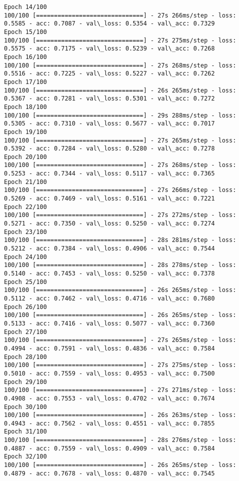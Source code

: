 \documentclass[11pt]{article}
\begin{document}
\begin{Verbatim}[commandchars=\\\{\}]
Epoch 14/100
100/100 [==============================] - 27s 266ms/step - loss: 0.5585 - acc: 0.7087 - val\_loss: 0.5354 - val\_acc: 0.7329
Epoch 15/100
100/100 [==============================] - 27s 275ms/step - loss: 0.5575 - acc: 0.7175 - val\_loss: 0.5239 - val\_acc: 0.7268
Epoch 16/100
100/100 [==============================] - 27s 268ms/step - loss: 0.5516 - acc: 0.7225 - val\_loss: 0.5227 - val\_acc: 0.7262
Epoch 17/100
100/100 [==============================] - 26s 265ms/step - loss: 0.5367 - acc: 0.7281 - val\_loss: 0.5301 - val\_acc: 0.7272
Epoch 18/100
100/100 [==============================] - 29s 288ms/step - loss: 0.5305 - acc: 0.7310 - val\_loss: 0.5677 - val\_acc: 0.7017
Epoch 19/100
100/100 [==============================] - 27s 265ms/step - loss: 0.5392 - acc: 0.7284 - val\_loss: 0.5280 - val\_acc: 0.7278
Epoch 20/100
100/100 [==============================] - 27s 268ms/step - loss: 0.5253 - acc: 0.7344 - val\_loss: 0.5117 - val\_acc: 0.7365
Epoch 21/100
100/100 [==============================] - 27s 266ms/step - loss: 0.5269 - acc: 0.7469 - val\_loss: 0.5161 - val\_acc: 0.7221
Epoch 22/100
100/100 [==============================] - 27s 272ms/step - loss: 0.5271 - acc: 0.7350 - val\_loss: 0.5250 - val\_acc: 0.7274
Epoch 23/100
100/100 [==============================] - 28s 281ms/step - loss: 0.5212 - acc: 0.7384 - val\_loss: 0.4906 - val\_acc: 0.7544
Epoch 24/100
100/100 [==============================] - 28s 278ms/step - loss: 0.5140 - acc: 0.7453 - val\_loss: 0.5250 - val\_acc: 0.7378
Epoch 25/100
100/100 [==============================] - 26s 265ms/step - loss: 0.5112 - acc: 0.7462 - val\_loss: 0.4716 - val\_acc: 0.7680
Epoch 26/100
100/100 [==============================] - 26s 265ms/step - loss: 0.5133 - acc: 0.7416 - val\_loss: 0.5077 - val\_acc: 0.7360
Epoch 27/100
100/100 [==============================] - 27s 265ms/step - loss: 0.4994 - acc: 0.7591 - val\_loss: 0.4836 - val\_acc: 0.7584
Epoch 28/100
100/100 [==============================] - 27s 275ms/step - loss: 0.5010 - acc: 0.7559 - val\_loss: 0.4953 - val\_acc: 0.7500
Epoch 29/100
100/100 [==============================] - 27s 271ms/step - loss: 0.4908 - acc: 0.7553 - val\_loss: 0.4702 - val\_acc: 0.7674
Epoch 30/100
100/100 [==============================] - 26s 263ms/step - loss: 0.4943 - acc: 0.7562 - val\_loss: 0.4551 - val\_acc: 0.7855
Epoch 31/100
100/100 [==============================] - 28s 276ms/step - loss: 0.4887 - acc: 0.7559 - val\_loss: 0.4909 - val\_acc: 0.7584
Epoch 32/100
100/100 [==============================] - 26s 265ms/step - loss: 0.4879 - acc: 0.7678 - val\_loss: 0.4870 - val\_acc: 0.7545

\end{Verbatim}
\end{document}
